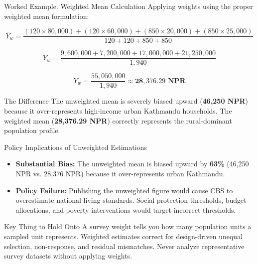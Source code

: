 \documentclass[10pt, aspectratio=169]{beamer}
\begin{document}
\begin{frame}{Worked Example: Weighted Mean Calculation}
  Applying weights using the proper weighted mean formulation:
  
  \begin{equation*}
    \overline{Y}_{w} = \frac{(120 \times 80,000) + (120 \times 60,000) + (850 \times 20,000) + (850 \times 25,000)}{120 + 120 + 850 + 850}
  \end{equation*}
  
  \begin{equation*}
    \overline{Y}_{w} = \frac{9,600,000 + 7,200,000 + 17,000,000 + 21,250,000}{1,940}
  \end{equation*}
  
  \begin{equation*}
    \overline{Y}_{w} = \frac{55,050,000}{1,940} \approx \mathbf{28,376.29\text{ NPR}}
  \end{equation*}

  \begin{block}{The Difference}
    The unweighted mean is severely biased upward (\textbf{46,250 NPR}) because it over-represents high-income urban Kathmandu households. The weighted mean (\textbf{28,376.29 NPR}) correctly represents the rural-dominant population profile.
  \end{block}
\end{frame}

\begin{frame}{Policy Implications of Unweighted Estimations}
  \begin{itemize}
    \item \textbf{Substantial Bias:} The unweighted mean is biased upward by \textbf{63\%} (46,250 NPR vs. 28,376 NPR) because it over-represents urban Kathmandu.
    \item \textbf{Policy Failure:} Publishing the unweighted figure would cause CBS to overestimate national living standards. Social protection thresholds, budget allocations, and poverty interventions would target incorrect thresholds.
  \end{itemize}

  \begin{alertblock}{Key Thing to Hold Onto}
    A survey weight tells you how many population units a sampled unit represents. Weighted estimates correct for design-driven unequal selection, non-response, and residual mismatches. Never analyze representative survey datasets without applying weights.
  \end{alertblock}
\end{frame}
\end{document}
